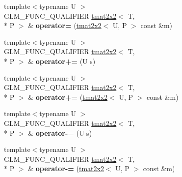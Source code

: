 \begin{DoxyCompactItemize}
\item 
\hypertarget{structglm_1_1detail_1_1tmat2x2_a08aa9a6143024b1c562f717273dbec95}{{\footnotesize template$<$typename U $>$ }\\G\-L\-M\-\_\-\-F\-U\-N\-C\-\_\-\-Q\-U\-A\-L\-I\-F\-I\-E\-R \hyperlink{structglm_1_1detail_1_1tmat2x2}{tmat2x2}$<$ T, \\*
P $>$ \& {\bfseries operator=} (\hyperlink{structglm_1_1detail_1_1tmat2x2}{tmat2x2}$<$ U, P $>$ const \&m)}\label{structglm_1_1detail_1_1tmat2x2_a08aa9a6143024b1c562f717273dbec95}

\item 
\hypertarget{structglm_1_1detail_1_1tmat2x2_a4168898bfdd14fbbbaa72a36ceb1514b}{{\footnotesize template$<$typename U $>$ }\\G\-L\-M\-\_\-\-F\-U\-N\-C\-\_\-\-Q\-U\-A\-L\-I\-F\-I\-E\-R \hyperlink{structglm_1_1detail_1_1tmat2x2}{tmat2x2}$<$ T, \\*
P $>$ \& {\bfseries operator+=} (U s)}\label{structglm_1_1detail_1_1tmat2x2_a4168898bfdd14fbbbaa72a36ceb1514b}

\item 
\hypertarget{structglm_1_1detail_1_1tmat2x2_a907826d7a4cc2e34f772eaf6ec95c2cf}{{\footnotesize template$<$typename U $>$ }\\G\-L\-M\-\_\-\-F\-U\-N\-C\-\_\-\-Q\-U\-A\-L\-I\-F\-I\-E\-R \hyperlink{structglm_1_1detail_1_1tmat2x2}{tmat2x2}$<$ T, \\*
P $>$ \& {\bfseries operator+=} (\hyperlink{structglm_1_1detail_1_1tmat2x2}{tmat2x2}$<$ U, P $>$ const \&m)}\label{structglm_1_1detail_1_1tmat2x2_a907826d7a4cc2e34f772eaf6ec95c2cf}

\item 
\hypertarget{structglm_1_1detail_1_1tmat2x2_a0e107a55fa775eb6e5f608ab3d6d67b5}{{\footnotesize template$<$typename U $>$ }\\G\-L\-M\-\_\-\-F\-U\-N\-C\-\_\-\-Q\-U\-A\-L\-I\-F\-I\-E\-R \hyperlink{structglm_1_1detail_1_1tmat2x2}{tmat2x2}$<$ T, \\*
P $>$ \& {\bfseries operator-\/=} (U s)}\label{structglm_1_1detail_1_1tmat2x2_a0e107a55fa775eb6e5f608ab3d6d67b5}

\item 
\hypertarget{structglm_1_1detail_1_1tmat2x2_acde6e0cc0e3c1df956a9e5fd0f3bbacd}{{\footnotesize template$<$typename U $>$ }\\G\-L\-M\-\_\-\-F\-U\-N\-C\-\_\-\-Q\-U\-A\-L\-I\-F\-I\-E\-R \hyperlink{structglm_1_1detail_1_1tmat2x2}{tmat2x2}$<$ T, \\*
P $>$ \& {\bfseries operator-\/=} (\hyperlink{structglm_1_1detail_1_1tmat2x2}{tmat2x2}$<$ U, P $>$ const \&m)}\label{structglm_1_1detail_1_1tmat2x2_acde6e0cc0e3c1df956a9e5fd0f3bbacd}


\end{DoxyCompactItemize}
